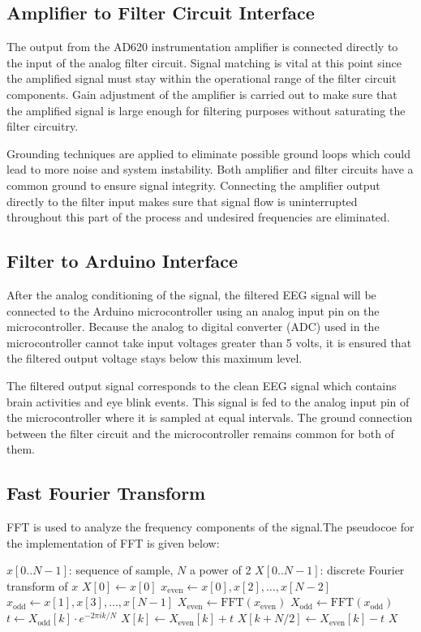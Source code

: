 \subsection{Amplifier to Filter Circuit Interface}
The output from the AD620 instrumentation amplifier is connected directly to the input of the analog filter circuit. Signal matching is vital at this point since the amplified signal must stay within the operational range of the filter circuit components. Gain adjustment of the amplifier is carried out to make sure that the amplified signal is large enough for filtering purposes without saturating the filter circuitry.

Grounding techniques are applied to eliminate possible ground loops which could lead to more noise and system instability. Both amplifier and filter circuits have a common ground to ensure signal integrity. Connecting the amplifier output directly to the filter input makes sure that signal flow is uninterrupted throughout this part of the process and undesired frequencies are eliminated.

\subsection{Filter to Arduino Interface}
After the analog conditioning of the signal, the filtered EEG signal will be connected to the Arduino microcontroller using an analog input pin on the microcontroller. Because the analog to digital converter (ADC) used in the microcontroller cannot take input voltages greater than 5 volts, it is ensured that the filtered output voltage stays below this maximum level.

The filtered output signal corresponds to the clean EEG signal which contains brain activities and eye blink events. This signal is fed to the analog input pin of the microcontroller where it is sampled at equal intervals. The ground connection between the filter circuit and the microcontroller remains common for both of them.
\subsection{Fast Fourier Transform}
FFT is used to analyze the frequency components of the signal.The pseudocoe for the implementation of FFT is given below:

\begin{algorithm}[H]
	\caption{Cooley-Tukey FFT}
	\label{alg:fft}
	\begin{algorithmic}[1]
		\Require $x[0..N-1]$: sequence of sample, $N$ a power of 2
		\Ensure $X[0..N-1]$: discrete Fourier transform of $x$
		\State $X[0] \gets x[0]$
		\Else
		\State $x_\text{even} \gets x[0], x[2], \dots, x[N-2]$
		\State $x_\text{odd} \gets x[1], x[3], \dots, x[N-1]$
		\State $X_\text{even} \gets \text{FFT}(x_\text{even})$
		\State $X_\text{odd} \gets \text{FFT}(x_\text{odd})$
		\State $t \gets X_\text{odd}[k] \cdot e^{-2 \pi i k / N}$
		\State $X[k] \gets X_\text{even}[k] + t$
		\State $X[k + N/2] \gets X_\text{even}[k] - t$
		\EndFor
		\EndIf
		\State \Return $X$
	\end{algorithmic}
\end{algorithm}

